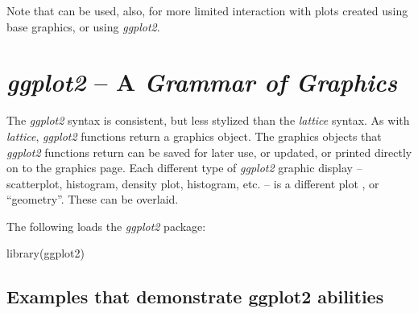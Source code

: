 Note that  can be used, also, for more limited
interaction with plots created using base graphics, or
using \textit{ggplot2}.


\section{\textit{ggplot2} -- A \textit{Grammar of  Graphics}}\label{sec:ggplot}


The {\em ggplot2} syntax is consistent, but less stylized than the
\textit{lattice} syntax.  As with \textit{lattice}, {\em ggplot2}
functions return a graphics object. The graphics objects that {\em
    ggplot2} functions return can be saved for later use, or updated,
  or printed directly on to the graphics page. Each different type of
{\em ggplot2} graphic display -- scatterplot, histogram, density plot,
histogram, etc. -- is a different plot , or
``geometry''.  These can be overlaid.

The following loads the {\em ggplot2} package:
\begin{Schunk}
\begin{Sinput}
library(ggplot2)
\end{Sinput}
\end{Schunk}

\subsection{Examples that demonstrate ggplot2 abilities}

